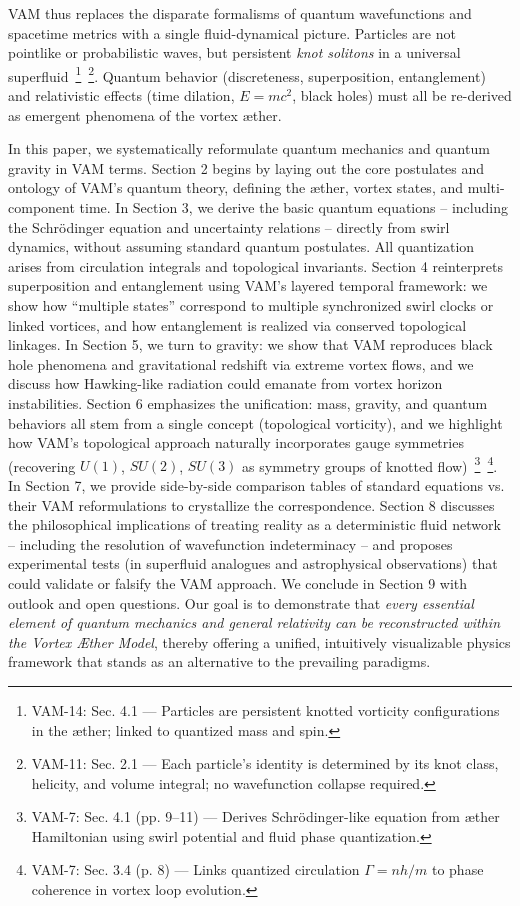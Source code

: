 \documentclass[a4paper,12pt]{article}
\begin{document}
    VAM thus replaces the disparate formalisms of quantum wavefunctions and spacetime metrics with a single fluid-dynamical picture. Particles are not pointlike or probabilistic waves, but persistent \emph{knot solitons} in a universal superfluid~\footnote{VAM-14: Sec. 4.1 — Particles are persistent knotted vorticity configurations in the æther; linked to quantized mass and spin.}~\footnote{VAM-11: Sec. 2.1 — Each particle’s identity is determined by its knot class, helicity, and volume integral; no wavefunction collapse required.}. Quantum behavior (discreteness, superposition, entanglement) and relativistic effects (time dilation, $E=mc^2$, black holes) must all be re-derived as emergent phenomena of the vortex æther.

    In this paper, we systematically reformulate quantum mechanics and quantum gravity in VAM terms. Section 2 begins by laying out the core postulates and ontology of VAM’s quantum theory, defining the æther, vortex states, and multi-component time. In Section 3, we derive the basic quantum equations -- including the Schrödinger equation and uncertainty relations -- directly from swirl dynamics, without assuming standard quantum postulates. All quantization arises from circulation integrals and topological invariants. Section 4 reinterprets superposition and entanglement using VAM’s layered temporal framework: we show how “multiple states” correspond to multiple synchronized swirl clocks or linked vortices, and how entanglement is realized via conserved topological linkages. In Section 5, we turn to gravity: we show that VAM reproduces black hole phenomena and gravitational redshift via extreme vortex flows, and we discuss how Hawking-like radiation could emanate from vortex horizon instabilities. Section 6 emphasizes the unification: mass, gravity, and quantum behaviors all stem from a single concept (topological vorticity), and we highlight how VAM’s topological approach naturally incorporates gauge symmetries (recovering $U(1)$, $SU(2)$, $SU(3)$ as symmetry groups of knotted flow)~\footnote{VAM-7: Sec. 4.1 (pp. 9–11) — Derives Schrödinger-like equation from æther Hamiltonian using swirl potential and fluid phase quantization.}~\footnote{VAM-7: Sec. 3.4 (p. 8) — Links quantized circulation $\Gamma = n h / m$ to phase coherence in vortex loop evolution.}. In Section 7, we provide side-by-side comparison tables of standard equations vs. their VAM reformulations to crystallize the correspondence. Section 8 discusses the philosophical implications of treating reality as a deterministic fluid network -- including the resolution of wavefunction indeterminacy -- and proposes experimental tests (in superfluid analogues and astrophysical observations) that could validate or falsify the VAM approach. We conclude in Section 9 with outlook and open questions. Our goal is to demonstrate that \emph{every essential element of quantum mechanics and general relativity can be reconstructed within the Vortex Æther Model}, thereby offering a unified, intuitively visualizable physics framework that stands as an alternative to the prevailing paradigms.
\end{document}
